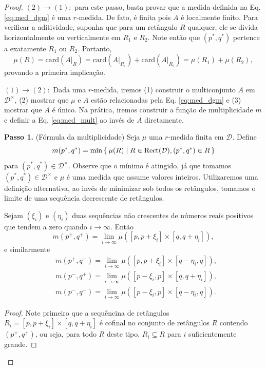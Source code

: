 \begin{proof}
$(2) \to (1):$ para este passo, basta provar que a medida definida na Eq. \eqref{eq:med_dgm} é uma $r$-medida.
De fato, é finita pois $A$ é localmente finito. Para verificar a aditividade, suponha que para um retângulo
$R$ qualquer, ele se divida horizontalmente ou verticalmente em $R_1$ e $R_2$. Note então que $(p^*,q^*)$
pertence a exatamente $R_1$ ou $R_2$. Portanto, 
\begin{equation*}
    \mu(R) = \text{card}(\left.A\right|_R) = \text{card}(\left.A\right|_{R_1}) + \text{card}(\left.A\right|_{R_2})
     = \mu(R_1) + \mu(R_2),
\end{equation*}
provando a primeira implicação. 

\noindent$(1) \to (2):$ Dada uma $r$-medida, iremos (1) construir o multiconjunto $A$ em $\mathcal{D}^\times$,
(2) mostrar que $\mu$ e $A$ estão relacionadas pela Eq. \eqref{eq:med_dgm} e (3) mostrar que $A$ é único. Na 
prática, iremos construir a função de multiplicidade $m$ e definir a Eq. \eqref{eq:med_mult} ao invés de $A$ diretamente.

\textbf{Passo 1.} (Fórmula da multiplicidade) Seja $\mu$ uma $r$-medida finita em $\mathcal{D}$. Define
\begin{equation}
    m(p^*, q^*) = \min \Set{\mu(R) | R \in \text{Rect}(\mathcal{D}), (p^*, q^*) \in R}
\end{equation}  
para $(p^*, q^*) \in \mathcal{D}^\times$. Observe que o mínimo é atingido, já que tomamos $(p^*, q^*) \in \mathcal{D}^\times$
e $\mu$ é uma medida que assume valores inteiros. Utilizaremos uma definição alternativa, ao invés de minimizar sob 
todos os retângulos, tomamos o limite de uma sequência decrescente de retângulos.  
\begin{lem}\label{teo:lem_med}
    Sejam $(\xi_i)$ e $(\eta_i)$ duas sequências não crescentes de números reais positivos
    que tendem a zero quando $i \to \infty$. Então
    \begin{equation*}
        m(p^+, q^+) = \lim_{i\to\infty} \mu([p,p+\xi_i] \times [q, q+\eta_i]),
    \end{equation*}
    e similarmente
    \begin{align*}
        & m(p^+, q^-) = \lim_{i\to\infty} \mu([p,p+\xi_i] \times [q-\eta_i, q]), \\
        & m(p^-, q^+) = \lim_{i\to\infty} \mu([p-\xi_i,p] \times [q, q+\eta_i]), \\
        & m(p^-, q^-) = \lim_{i\to\infty} \mu([p-\xi_i,p] \times [q-\eta_i,q]).
    \end{align*}
\end{lem}
\begin{proof}
    Note primeiro que a sequêncina de retângulos $R_i = [p, p+\xi_i] \times [q, q+\eta_i]$ é 
    cofinal no conjunto de retângulos $R$ contendo $(p^+, q^+)$, ou seja, para todo $R$ deste 
    tipo, $R_i \subseteq R$ para $i$ suficientemente grande.
    

\end{proof}
\end{proof}
